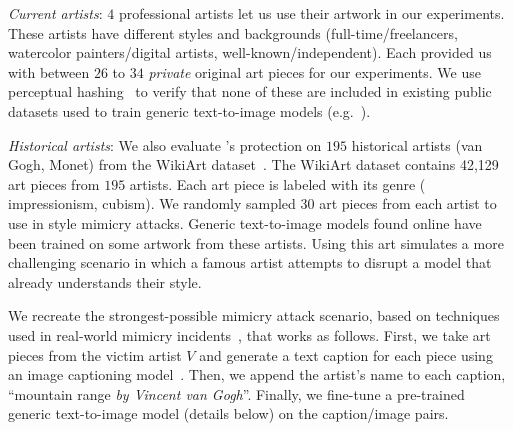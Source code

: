 \vspace{-0.2cm}
\begin{packed_itemize}
\item {\em Current artists}: $4$ professional artists let us use their
  artwork in our experiments. These artists have different styles and
  backgrounds (\eg full-time/freelancers, watercolor painters/digital
  artists, well-known/independent). Each provided us with between $26$ to
  $34$ \textit{private} original art pieces for our experiments. We use
  perceptual hashing~\cite{ke2004efficient} to verify that none of these are
  included in existing public datasets used to train generic text-to-image
  models (e.g.~\cite{schuhmann2022laion,changpinyo2021conceptual}).  

\item {\em Historical artists}: We also evaluate \system{}'s protection on
  $195$ historical artists (\eg van Gogh, Monet) from the WikiArt
  dataset~\cite{saleh2015large}. The WikiArt dataset contains 42,129 art
  pieces from $195$ artists. Each art piece is labeled with its genre (\eg
  impressionism, cubism). We randomly sampled $30$ art pieces from each
  artist to use in style mimicry attacks. Generic text-to-image models found
  online have been trained on some artwork from these artists. Using this art
  simulates a more challenging scenario in which a famous artist attempts
  to disrupt a model that already understands their style.
\end{packed_itemize}
\vspace{-0.2cm}

 We recreate the strongest-possible mimicry
attack scenario, based on techniques used in real-world mimicry
incidents~\cite{ruiz2022dreambooth,sam-steal,hollie-steal},
that works as follows. First, we take art pieces from the victim artist $V$
and generate a text caption for each piece using an image captioning
model~\cite{luo2022vc}.  Then, we append the artist's name to each caption,
\eg ``mountain range \textit{by Vincent van Gogh}''. Finally, we fine-tune a pre-trained generic text-to-image model
(details below) on the caption/image pairs. 

